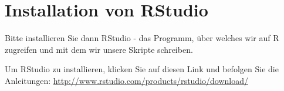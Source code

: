 \documentclass[
]{book}
\begin{document}
\hypertarget{installation-von-rstudio}{%
\section{Installation von RStudio}\label{installation-von-rstudio}}

Bitte installieren Sie dann RStudio - das Programm, über welches wir auf R zugreifen und mit dem wir unsere Skripte schreiben.

Um RStudio zu installieren, klicken Sie auf diesen Link und befolgen Sie die Anleitungen: \url{http://www.rstudio.com/products/rstudio/download/}

  
\end{document}
